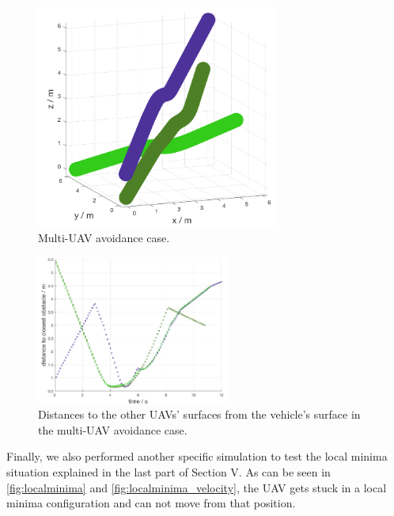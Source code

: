 \documentclass[journal]{IEEEtran}
\begin{document}
		\begin{figure}[h]
			\centering
			\includegraphics[width=8cm]{Results/Potentialfields/multi_uav_avoidance}
			\caption{Multi-UAV avoidance case.}
			\label{fig:multi_uav_avoidance}
		\end{figure}
	
		\begin{figure}[h]
			\centering
			\includegraphics[width=2.5in]{Results/Potentialfields/multi_uav_avoidance_obstacle}
			\caption{Distances to the other UAVs' surfaces from the vehicle's surface in the multi-UAV avoidance case.}
			\label{fig:multi_uav_avoidance_distance}
		\end{figure}
	
		Finally, we also performed another specific simulation to test the local minima situation explained in the last part of Section V. As can be seen in \figurename{ \ref{fig:localminima}} and \figurename{ \ref{fig:localminima_velocity}}, the UAV gets stuck in a local minima configuration and can not move from that position. 
		
\end{document}
